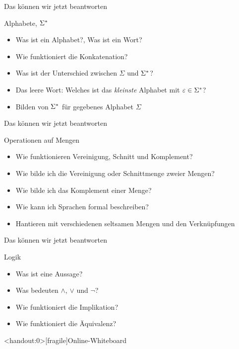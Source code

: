 \begin{frame}[fragile]{Das können wir jetzt beantworten}
    \begin{alertblock}{Alphabete, $\Sigma^{*}$}
    \begin{itemize}
        \item Was ist ein Alphabet?, Was ist ein Wort?
        \item Wie funktioniert die Konkatenation?
        \item Was ist der Unterschied zwischen $\Sigma$ und $\Sigma^{*}$?
        \item Das leere Wort: Welches ist das \textit{kleinste} Alphabet mit $\varepsilon \in \Sigma^{*}$?
        \item Bilden von $\Sigma^{*}$ für gegebenes Alphabet $\Sigma$
    \end{itemize}
    \end{alertblock}
\end{frame}

\begin{frame}[fragile]{Das können wir jetzt beantworten}
    \begin{alertblock}{Operationen auf Mengen}
    \begin{itemize}
        \item Wie funktionieren Vereinigung, Schnitt und Komplement?
        \item Wie bilde ich die Vereinigung oder Schnittmenge zweier Mengen?
        \item Wie bilde ich das Komplement einer Menge?
        \item Wie kann ich Sprachen formal beschreiben?
        \item Hantieren mit verschiedenen seltsamen Mengen und den Verknüpfungen
    \end{itemize}
    \end{alertblock}
\end{frame}

\begin{frame}[fragile]{Das können wir jetzt beantworten}
	\begin{alertblock}{Logik}
		\begin{itemize}
			\item Was ist eine Aussage?
			\item Was bedeuten $\wedge$, $\vee$ und $\neg$?
			\item Wie funktioniert die Implikation?
			\item Wie funktioniert die Äquivalenz?
		\end{itemize}
	\end{alertblock}
\end{frame}




\appendix

\begin{frame}<handout:0>[fragile]{Online-Whiteboard}
	\phantom{text}
\end{frame}


